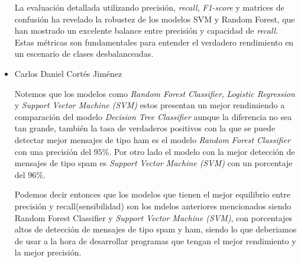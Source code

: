\begin{itemize}
    La evaluación detallada utilizando precisión, \textit{recall}, \textit{F1-score} y matrices de confusión ha revelado la robustez de los modelos SVM y 
    Random Forest, que han mostrado un excelente balance entre precisión y capacidad de \textit{recall}. Estas métricas son fundamentales para 
    entender el verdadero rendimiento en un escenario de clases desbalanceadas.

    \item Carlos Daniel Cortés Jiménez

    Notemos que los modelos como \textit{Random Forest Classifier}, \textit{Logistic Regression} y \textit{Support Vector Machine (SVM)} estos presentan un mejor rendimiendo a comparación del modelo \textit{Decision Tree Classifier} aunque la diferencia no sea tan grande, también la tasa de verdaderos positivos con la que se puede detectar mejor mensajes de tipo ham es el modelo \textit{Random Forest Classifier} con una precisión del $95\%$. Por otro lado el modelo con la mejor detección de mensajes de tipo spam es \textit{Support Vector Machine (SVM)} con un porcentaje del $96\%$.

    Podemos decir entonces que los modelos que tienen el mejor equilibrio entre precisión y recall(sensibilidad) son los mdelos anteriores mencionados siendo Random Forest Classifier y \textit{Support Vector Machine (SVM)}, con porcentajes altos de detección de mensajes de tipo spam y ham, siendo lo que deberiamos de usar a la hora de desarrollar programas que tengan el mejor rendimiento y la mejor precisión.

\end{itemize}